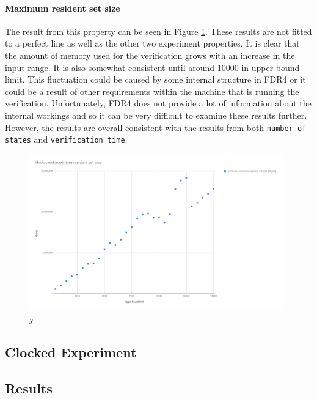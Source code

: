 \paragraph{Maximum resident set size}
The result from this property can be seen in Figure \ref{fig:unclocked_resident_size}. These results are not fitted to a perfect line as well as the other two experiment properties. It is clear that the amount of memory used for the verification grows with an increase in the input range. It is also somewhat consistent until around 10000 in upper bound limit. This fluctuation could be caused by some internal structure in FDR4 or it could be a result of other requirements within the machine that is running the verification. Unfortunately, FDR4 does not provide a lot of information about the internal workings and so it can be very difficult to examine these results further. However, the results are overall consistent with the results from both \texttt{number of states} and \texttt{verification time}.
\begin{figure}
    \includegraphics[width=0.98\textwidth]{./figures/15-11-2018/unclocked_maximum_resident_set_size.jpg}
\caption{y}
\label{fig:unclocked_resident_size}
\end{figure}



\subsection{Clocked Experiment}
\subsection{Results}

